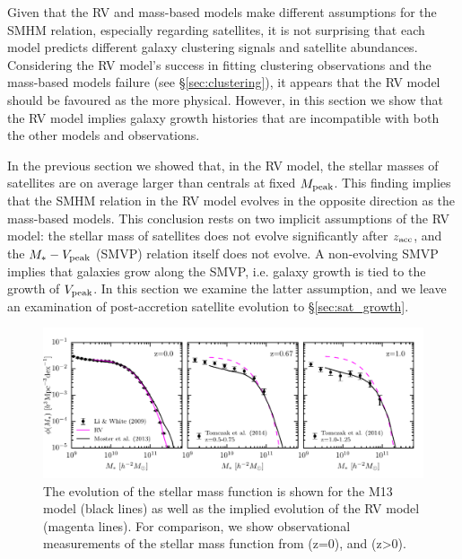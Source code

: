 \documentclass[a4paper,fleqn,usenatbib]{mnras}
\begin{document}
Given that the RV and mass-based models make different assumptions for the SMHM relation, especially regarding satellites, it is not surprising that each model predicts different galaxy clustering signals and satellite abundances.   Considering the RV model's success in fitting clustering observations and the mass-based models failure (see \S \ref{sec:clustering}), it appears that the RV model should be favoured as the more physical.  However, in this section we show that the RV model implies galaxy growth histories that are incompatible with both the other models and observations.

In the previous section we showed that, in the RV model, the stellar masses of satellites are on average larger than centrals at fixed $M_{\rm peak}$.  This finding implies that the SMHM relation in the RV model evolves in the opposite direction as the mass-based models.  This conclusion rests on two implicit assumptions of the RV model: the stellar mass of satellites does not evolve significantly after $z_{\rm acc}$, and the $M_* - V_{\rm peak}$ (SMVP) relation itself does not evolve.  A non-evolving SMVP implies that galaxies grow along the SMVP, i.e. galaxy growth is tied to the growth of $V_{\rm peak}$.  In this section we examine the latter assumption, and we leave an examination of post-accretion satellite evolution to \S \ref{sec:sat_growth}.  

\begin{figure}
    \includegraphics{figures/stellar_mass_function_evolution.pdf}
    \caption{The evolution of the stellar mass function is shown for the M13 model (black lines) as well as the implied evolution of the RV model (magenta lines).  For comparison, we show observational measurements of the stellar mass function from  \citet{Li:2009kh} (z=0), and \citet{Tomczak2014:db} (z>0).}
    \label{fig:stellar_mass_function_evolution}
\end{figure}
\end{document}
